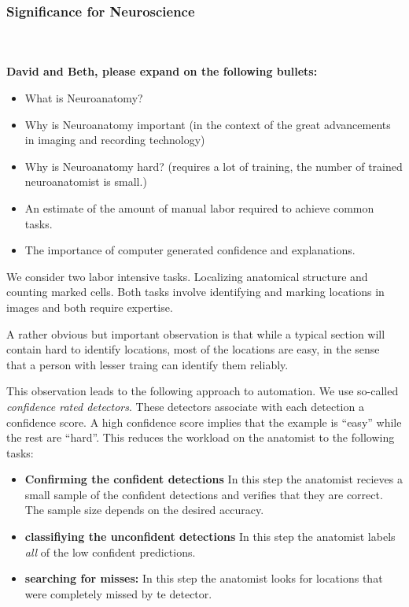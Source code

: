 \documentclass[11pt]{article}
\begin{document}
\subsubsection {Significance for Neuroscience}
~\\ ~\\
{\bf David and Beth, please expand on the following bullets:}
\begin{itemize}
\item What is Neuroanatomy?
\item Why is Neuroanatomy important (in the context of the great
    advancements in imaging and recording technology)
\item Why is Neuroanatomy hard? (requires a lot of training, the
  number of trained neuroanatomist is small.)
\item An estimate of the amount of manual labor required to achieve
  common tasks.
\item The importance of computer generated confidence and explanations.
\end{itemize}


We consider two labor intensive tasks. Localizing anatomical structure
and counting marked cells. Both tasks involve identifying and marking
locations in images and both require expertise.

A rather obvious but important observation is that while a typical
section will contain hard to identify locations, most of the locations
are easy, in the sense that a person with lesser traing can identify
them reliably.

This observation leads to the following approach to automation. We
use so-called {\em confidence rated detectors}. These detectors
associate with each detection a confidence score. A high confidence
score implies that the example is ``easy''  while the rest are
``hard''. This reduces the workload on the anatomist to the following
tasks:
\begin{itemize}
  \item {\bf Confirming the confident detections} In this step the
    anatomist recieves a small sample of the confident detections and
    verifies that they are correct. The sample size depends on the
    desired accuracy.
    \item {\bf classifiying the unconfident detections} In this step
      the anatomist labels {\em all} of the low confident predictions.
    \item {\bf searching for misses:} In this step the anatomist looks
      for locations that were completely missed by te detector.
  \end{itemize}
  
\end{document}
